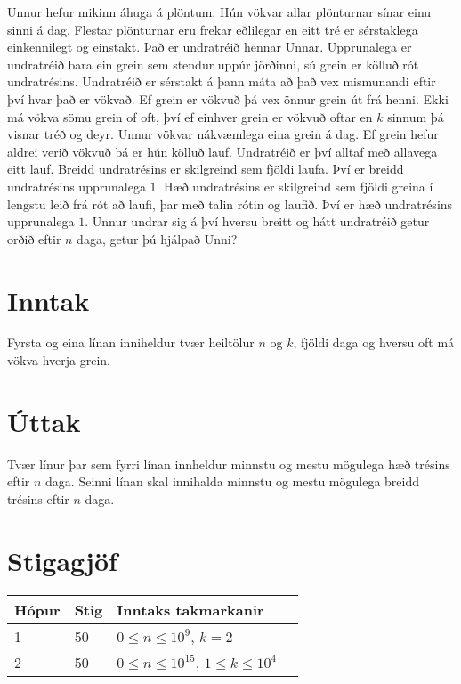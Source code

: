 Unnur hefur mikinn áhuga á plöntum. Hún vökvar allar plönturnar sínar einu sinni á dag.
Flestar plönturnar eru frekar eðlilegar en eitt tré er sérstaklega einkennilegt og einstakt. Það er undratréið hennar Unnar.
Upprunalega er undratréið bara ein grein sem stendur uppúr jörðinni, sú grein er kölluð rót undratrésins. Undratréið er sérstakt á þann máta að það vex mismunandi eftir því hvar það er vökvað.
Ef grein er vökvuð þá vex önnur grein út frá henni. Ekki má vökva sömu grein of oft, því ef einhver grein er vökvuð oftar en $k$ sinnum þá visnar tréð og deyr. Unnur vökvar nákvæmlega eina grein á dag.
Ef grein hefur aldrei verið vökvuð þá er hún kölluð lauf. Undratréið er því alltaf með allavega eitt lauf.
Breidd undratrésins er skilgreind sem fjöldi laufa. Því er breidd undratrésins upprunalega $1$.
Hæð undratrésins er skilgreind sem fjöldi greina í lengstu leið frá rót að laufi, þar með talin rótin og laufið. Því er hæð undratrésins upprunalega $1$.
Unnur undrar sig á því hversu breitt og hátt undratréið getur orðið eftir $n$ daga, getur þú hjálpað Unni?

\section*{Inntak}
Fyrsta og eina línan inniheldur tvær heiltölur $n$ og $k$, fjöldi daga og hversu oft má vökva hverja grein.

\section*{Úttak}
Tvær línur þar sem fyrri línan innheldur minnstu og mestu mögulega hæð trésins eftir $n$ daga.
Seinni línan skal innihalda minnstu og mestu mögulega breidd trésins eftir $n$ daga.

\section*{Stigagjöf}
\begin{tabular}{|l|l|l|l|}
\hline
Hópur & Stig & Inntaks takmarkanir \\ \hline
    1 &   50 & $0 \leq n \leq 10^{9}$, $k = 2$ \\ \hline
    2 &   50 & $0 \leq n \leq 10^{15}$, $1 \leq k \leq 10^4$ \\ \hline
\end{tabular}
